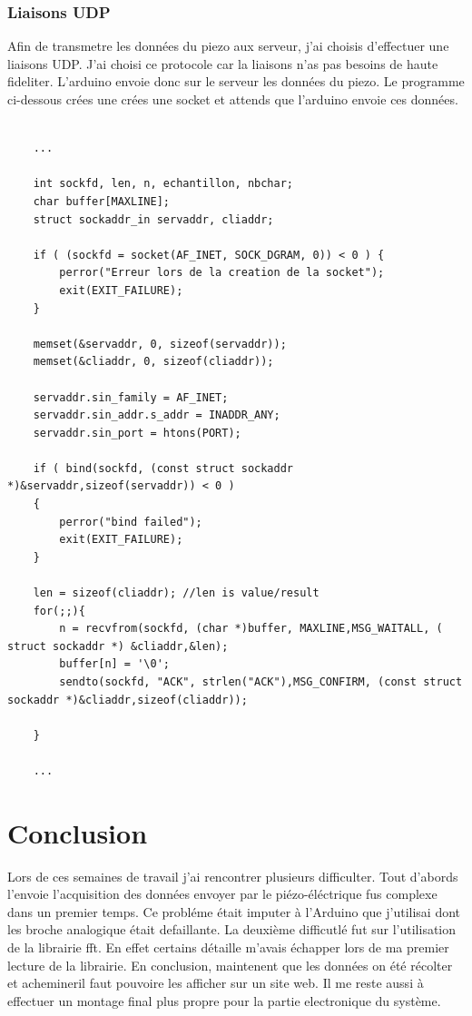 \documentclass[11pt,french,a4paper]{article}
\begin{document}
\subsubsection{Liaisons UDP}
Afin de transmetre les données du piezo aux serveur, j'ai choisis d'effectuer une liaisons UDP. J'ai choisi ce protocole car la liaisons n'as pas besoins de haute fideliter. L'arduino envoie donc sur le serveur les données du piezo. Le programme ci-dessous crées une crées une socket et attends que l'arduino envoie ces données. 
\begin{scriptsize}
\begin{lstlisting}

	...

	int sockfd, len, n, echantillon, nbchar;
	char buffer[MAXLINE];
	struct sockaddr_in servaddr, cliaddr;
	
	if ( (sockfd = socket(AF_INET, SOCK_DGRAM, 0)) < 0 ) {
		perror("Erreur lors de la creation de la socket");
		exit(EXIT_FAILURE);
	}

	memset(&servaddr, 0, sizeof(servaddr));
	memset(&cliaddr, 0, sizeof(cliaddr));

	servaddr.sin_family = AF_INET; 
	servaddr.sin_addr.s_addr = INADDR_ANY;
	servaddr.sin_port = htons(PORT);

	if ( bind(sockfd, (const struct sockaddr *)&servaddr,sizeof(servaddr)) < 0 )
	{
		perror("bind failed");
		exit(EXIT_FAILURE);
	}

	len = sizeof(cliaddr); //len is value/result
	for(;;){
		n = recvfrom(sockfd, (char *)buffer, MAXLINE,MSG_WAITALL, ( struct sockaddr *) &cliaddr,&len);
		buffer[n] = '\0';
		sendto(sockfd, "ACK", strlen("ACK"),MSG_CONFIRM, (const struct sockaddr *)&cliaddr,sizeof(cliaddr));
	
	}

	...
\end{lstlisting}
\end{scriptsize}
\section{Conclusion}
Lors de ces semaines de travail j'ai rencontrer plusieurs difficulter. Tout d'abords l'envoie l'acquisition des données envoyer par le piézo-éléctrique fus complexe dans un premier temps. Ce probléme était imputer à l'Arduino que j'utilisai dont les broche analogique était defaillante. La deuxième difficutlé fut sur l'utilisation de la librairie fft. En effet certains détaille m'avais échapper lors de ma premier lecture de la librairie.
En conclusion, maintenent que les données on été récolter et achemineril faut pouvoire les afficher sur un site web. Il me reste aussi à effectuer un montage final plus propre pour la partie electronique du système. 
\newpage
\appendix
		
	\label{code}

\listoffigures
\end{document}
